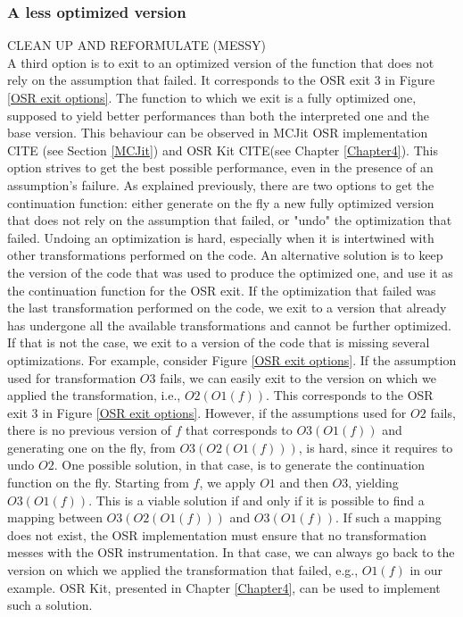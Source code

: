 \subsubsection{A less optimized version}
CLEAN UP AND REFORMULATE (MESSY)\\

A third option is to exit to an optimized version of the function that does not rely on the assumption that failed.
It corresponds to the OSR exit 3 in Figure \ref{OSR exit options}.
The function to which we exit is a fully optimized one, supposed to yield better performances than both the interpreted one and the base version.
This behaviour can be observed in MCJit OSR implementation CITE (see Section \ref{MCJit}) and OSR Kit CITE(see Chapter \ref{Chapter4}).
This option strives to get the best possible performance, even in the presence of an assumption's failure.
As explained previously, there are two options to get the continuation function: either generate on the fly a new fully optimized version that does not rely on the assumption that failed, or "undo" the optimization that failed.
Undoing an optimization is hard, especially when it is intertwined with other transformations performed on the code.
An alternative solution is to keep the version of the code that was used to produce the optimized one, and use it as the continuation function for the OSR exit.
If the optimization that failed was the last transformation performed on the code, we exit to a version that already has undergone all the available transformations and cannot be further optimized.
If that is not the case, we exit to a version of the code that is missing several optimizations.
For example, consider Figure \ref{OSR exit options}. 
If the assumption used for transformation $O3$ fails, we can easily exit to the version on which we applied the transformation, i.e., $O2(O1(f))$.
This corresponds to the OSR exit 3 in Figure \ref{OSR exit options}.
However, if the assumptions used for $O2$ fails, there is no previous version of $f$ that corresponds to $O3(O1(f))$ and generating one on the fly, from $O3(O2(O1(f)))$, is hard, since it requires to undo $O2$.
One possible solution, in that case, is to generate the continuation function on the fly.
Starting from $f$, we apply $O1$ and then $O3$, yielding $O3(O1(f))$.
This is a viable solution if and only if it is possible to find a mapping between $O3(O2(O1(f)))$ and $O3(O1(f))$.
If such a mapping does not exist, the OSR implementation must ensure that no transformation messes with the OSR instrumentation.
In that case, we can always go back to the version on which we applied the transformation that failed, e.g., $O1(f)$ in our example.
OSR Kit, presented in Chapter \ref{Chapter4}, can be used to implement such a solution.\\

